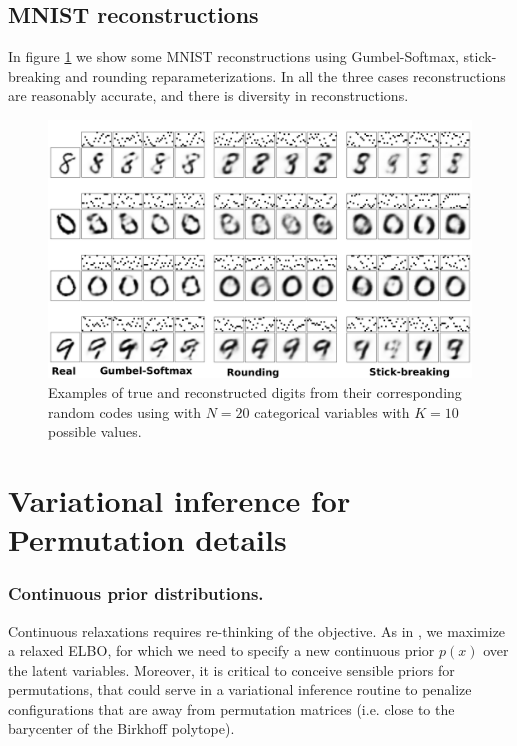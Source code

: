 \documentclass[twoside]{article}
\begin{document}

\subsection*{MNIST reconstructions}
In figure \ref{fig:VAE} we show some MNIST  reconstructions using Gumbel-Softmax, stick-breaking and rounding reparameterizations. In all the three cases reconstructions are reasonably accurate, and there is diversity in reconstructions.
\begin{figure}[t]
  \centering
  \includegraphics[width=5.in]{../figures/figure4.pdf} 
  \caption{Examples of true and reconstructed digits from their corresponding random codes using with $N=20$ categorical variables with $K=10$ possible values.
  }
\label{fig:VAE}
\end{figure}


\section{Variational inference for Permutation details}

\subsubsection*{Continuous prior distributions.} 
Continuous relaxations requires
re-thinking of the objective. As in \cite{maddison2016concrete}, we
maximize a relaxed ELBO, for which we need to specify a new continuous
prior $p(x)$ over the latent variables. Moreover, it is critical to conceive sensible priors for permutations, that could serve in a variational inference routine to penalize configurations that are away from permutation matrices (i.e. close to the barycenter of the Birkhoff polytope).
\end{document}

